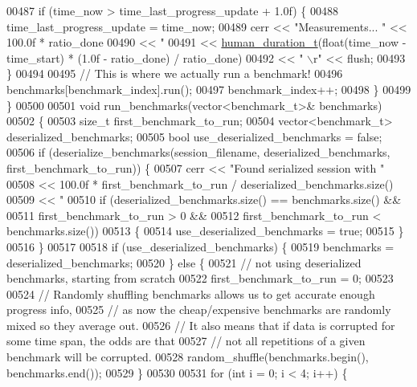 \begin{DoxyCode}
{{{{{00487     \textcolor{keywordflow}{if} (time\_now > time\_last\_progress\_update + 1.0f) \{
00488       time\_last\_progress\_update = time\_now;
00489       cerr << \textcolor{stringliteral}{"Measurements... "} << 100.0f * ratio\_done
00490            << \textcolor{stringliteral}{" %
00491            << \hyperlink{structhuman__duration__t}{human\_duration\_t}(\textcolor{keywordtype}{float}(time\_now - time\_start) * (1.0f - ratio\_done) / 
      ratio\_done)
00492            << \textcolor{stringliteral}{"                          \(\backslash\)r"} << flush;
00493     \}
00494 
00495     \textcolor{comment}{// This is where we actually run a benchmark!}
00496     benchmarks[benchmark\_index].run();
00497     benchmark\_index++;
00498   \}
00499 \}
00500 
00501 \textcolor{keywordtype}{void} run\_benchmarks(vector<benchmark\_t>& benchmarks)
00502 \{
00503   \textcolor{keywordtype}{size\_t} first\_benchmark\_to\_run;
00504   vector<benchmark\_t> deserialized\_benchmarks;
00505   \textcolor{keywordtype}{bool} use\_deserialized\_benchmarks = \textcolor{keyword}{false};
00506   \textcolor{keywordflow}{if} (deserialize\_benchmarks(session\_filename, deserialized\_benchmarks, first\_benchmark\_to\_run)) \{
00507     cerr << \textcolor{stringliteral}{"Found serialized session with "}
00508          << 100.0f * first\_benchmark\_to\_run / deserialized\_benchmarks.size()
00509          << \textcolor{stringliteral}{" %
00510     \textcolor{keywordflow}{if} (deserialized\_benchmarks.size() == benchmarks.size() &&
00511         first\_benchmark\_to\_run > 0 &&
00512         first\_benchmark\_to\_run < benchmarks.size())
00513     \{
00514       use\_deserialized\_benchmarks = \textcolor{keyword}{true};
00515     \}
00516   \}
00517 
00518   \textcolor{keywordflow}{if} (use\_deserialized\_benchmarks) \{
00519     benchmarks = deserialized\_benchmarks;
00520   \} \textcolor{keywordflow}{else} \{
00521     \textcolor{comment}{// not using deserialized benchmarks, starting from scratch}
00522     first\_benchmark\_to\_run = 0;
00523 
00524     \textcolor{comment}{// Randomly shuffling benchmarks allows us to get accurate enough progress info,}
00525     \textcolor{comment}{// as now the cheap/expensive benchmarks are randomly mixed so they average out.}
00526     \textcolor{comment}{// It also means that if data is corrupted for some time span, the odds are that}
00527     \textcolor{comment}{// not all repetitions of a given benchmark will be corrupted.}
00528     random\_shuffle(benchmarks.begin(), benchmarks.end());
00529   \}
00530 
00531   \textcolor{keywordflow}{for} (\textcolor{keywordtype}{int} i = 0; i < 4; i++) \{
}}}}}}}
\end{DoxyCode}
